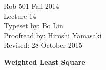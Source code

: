 \documentclass[letterpaper]{article}
\begin{document}
\baselineskip=48pt  %


\setlength{\parskip}{.3in}
\setlength{\itemsep}{.3in}

\pagestyle{plain}

{\Large \bf
\begin{center}
Rob 501 Fall 2014\\
Lecture 14\\
Typeset by:  Bo Lin\\
Proofread by: Hiroshi Yamasaki\\
Revised: 28 October 2015
\end{center}
}

\Large

\begin{center}\textbf{Weighted Least Square}\end{center}
\end{document}

